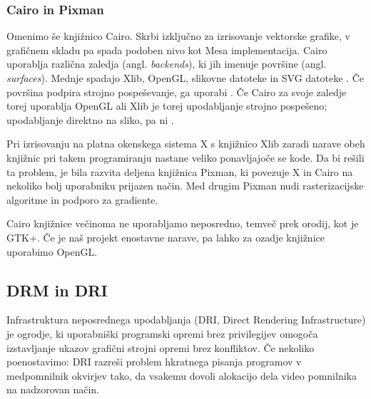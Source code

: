 \documentclass{article}
\begin{document}
\subsubsection{Cairo in Pixman}
Omenimo še knjižnico Cairo. Skrbi izključno za izrisovanje vektorske grafike, v grafičnem skladu pa spada podoben nivo kot Mesa implementacija. Cairo uporablja različna zaledja (angl. \textit{backends}), ki jih imenuje površine (angl. \textit{surfaces}). Mednje spadajo Xlib, OpenGL, slikovne datoteke in SVG datoteke \autocite{cairobackends}. Če površina podpira strojno pospeševanje, ga uporabi \autocite{cairo}. Če Cairo za svoje zaledje torej uporablja OpenGL ali Xlib je torej upodabljanje strojno pospešeno; upodabljanje direktno na sliko, pa ni \autocite{cairoimgsurfaces}. 

Pri izrisovanju na platna okenskega sistema X s knjižnico Xlib zaradi narave obeh knjižnic pri takem programiranju nastane veliko ponavljajoče se kode. Da bi rešili ta problem, je bila razvita deljena knjižnica Pixman, ki povezuje X in Cairo na nekoliko bolj uporabniku prijazen način. Med drugim Pixman nudi rasterizacijske algoritme in podporo za gradiente.

Cairo knjižnice večinoma ne uporabljamo neposredno, temveč prek orodij, kot je GTK+. Če je naš projekt enostavne narave, pa lahko za ozadje knjižnice uporabimo OpenGL.

\subsection{DRM in DRI}
Infrastruktura neposrednega upodabljanja (DRI, Direct Rendering Infrastructure) \autocite{dri} je ogrodje, ki uporabniški programski opremi brez privilegijev omogoča izstavljanje ukazov grafični strojni opremi brez konfliktov. Če nekoliko poenostavimo: DRI razreši problem hkratnega pisanja programov v medpomnilnik okvirjev tako, da vsakemu dovoli alokacijo dela video pomnilnika na nadzorovan način.
\end{document}
